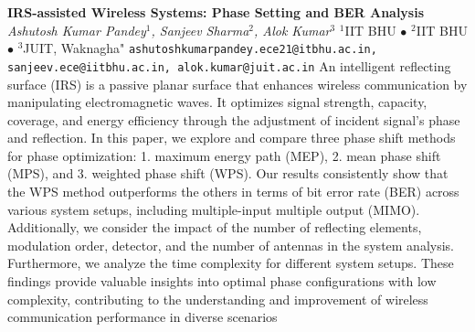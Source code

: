 
    \begin{conf-abstract}[]
        {\textbf{IRS-assisted Wireless Systems: Phase Setting and BER Analysis}}
        {\textit{Ashutosh Kumar Pandey$^{1}$, Sanjeev Sharma$^{2}$, Alok Kumar$^{3}$}}
        {$^{1}$IIT BHU $\bullet$ $^{2}$IIT BHU $\bullet$ $^{3}$JUIT, Waknagha"}
        {\texttt{ashutoshkumarpandey.ece21@itbhu.ac.in, sanjeev.ece@iitbhu.ac.in, alok.kumar@juit.ac.in}}
        {An intelligent reflecting surface (IRS) is a passive planar surface that enhances wireless communication by manipulating electromagnetic waves. It optimizes signal strength, capacity, coverage, and energy efficiency through the adjustment of incident signal's phase and reflection. In this paper, we explore and compare three phase shift methods for phase optimization: 1. maximum energy path (MEP), 2. mean phase shift (MPS), and 3. weighted phase shift (WPS). Our results consistently show that the WPS method outperforms the others in terms of bit error rate (BER) across various system setups, including multiple-input multiple output (MIMO). Additionally, we consider the impact of the number of reflecting elements, modulation order, detector, and the number of antennas in the system analysis. Furthermore, we analyze the time complexity for different system setups. These findings provide valuable insights into optimal phase configurations with low complexity, contributing to the understanding and improvement of wireless communication performance in diverse scenarios}
    \end{conf-abstract}
        